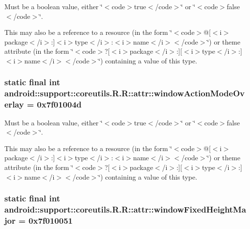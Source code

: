 Must be a boolean value, either \char`\"{}$<$code$>$true$<$/code$>$\char`\"{} or \char`\"{}$<$code$>$false$<$/code$>$\char`\"{}. 

This may also be a reference to a resource (in the form \char`\"{}$<$code$>$@\mbox{[}$<$i$>$package$<$/i$>$:\mbox{]}$<$i$>$type$<$/i$>$:$<$i$>$name$<$/i$>$$<$/code$>$\char`\"{}) or theme attribute (in the form \char`\"{}$<$code$>$?\mbox{[}$<$i$>$package$<$/i$>$:\mbox{]}\mbox{[}$<$i$>$type$<$/i$>$:\mbox{]}$<$i$>$name$<$/i$>$$<$/code$>$\char`\"{}) containing a value of this type. \hypertarget{classandroid_1_1support_1_1coreutils_1_1_r_1_1attr_a034f575b5e530edcb037e32fffae647}{
\subsubsection[{windowActionModeOverlay}]{\setlength{\rightskip}{0pt plus 5cm}static final int android::support::coreutils.R.R::attr::windowActionModeOverlay = 0x7f01004d}}
\label{classandroid_1_1support_1_1coreutils_1_1_r_1_1attr_a034f575b5e530edcb037e32fffae647}


Must be a boolean value, either \char`\"{}$<$code$>$true$<$/code$>$\char`\"{} or \char`\"{}$<$code$>$false$<$/code$>$\char`\"{}. 

This may also be a reference to a resource (in the form \char`\"{}$<$code$>$@\mbox{[}$<$i$>$package$<$/i$>$:\mbox{]}$<$i$>$type$<$/i$>$:$<$i$>$name$<$/i$>$$<$/code$>$\char`\"{}) or theme attribute (in the form \char`\"{}$<$code$>$?\mbox{[}$<$i$>$package$<$/i$>$:\mbox{]}\mbox{[}$<$i$>$type$<$/i$>$:\mbox{]}$<$i$>$name$<$/i$>$$<$/code$>$\char`\"{}) containing a value of this type. \hypertarget{classandroid_1_1support_1_1coreutils_1_1_r_1_1attr_0f1059301666c333223e37ee595ef9fc}{
\subsubsection[{windowFixedHeightMajor}]{\setlength{\rightskip}{0pt plus 5cm}static final int android::support::coreutils.R.R::attr::windowFixedHeightMajor = 0x7f010051}}
\label{classandroid_1_1support_1_1coreutils_1_1_r_1_1attr_0f1059301666c333223e37ee595ef9fc}


